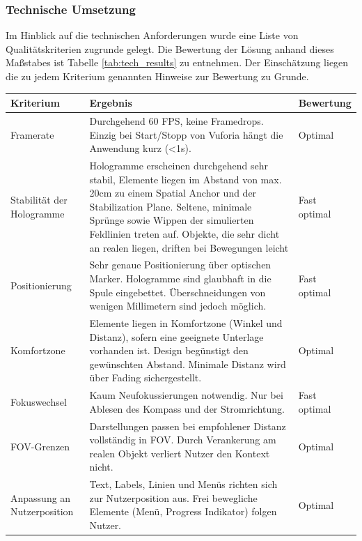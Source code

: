 \subsubsection{Technische Umsetzung}
Im Hinblick auf die technischen Anforderungen wurde eine Liste von Qualitätskriterien zugrunde gelegt. Die Bewertung der Lösung anhand dieses Maßstabes ist Tabelle \ref{tab:tech_results} zu entnehmen. Der Einschätzung liegen die zu jedem Kriterium genannten Hinweise zur Bewertung zu Grunde.
\begin{landscape}
	\bgroup
	\setlength\extrarowheight{-2pt}
	\def\arraystretch{1.8}
	\begin{table}
		\centering
		\begin{tabular}{m{2.3cm}|m{15.5cm}|m{2cm}}
			Kriterium & Ergebnis & Bewertung\\
			\hline
			\hline
			Framerate & Durchgehend 60 FPS, keine Framedrops. Einzig bei Start/Stopp von Vuforia hängt die Anwendung kurz (<1s). & Optimal\\
			\hline
			Stabilität der Hologramme & Hologramme erscheinen durchgehend sehr stabil, Elemente liegen im Abstand von max. 20cm zu einem Spatial Anchor und der Stabilization Plane. Seltene, minimale Sprünge sowie Wippen der simulierten Feldlinien treten auf. Objekte, die sehr dicht an realen liegen, driften bei Bewegungen leicht & Fast optimal\\
			\hline
			Positionierung & Sehr genaue Positionierung über optischen Marker. Hologramme sind glaubhaft in die Spule eingebettet. Überschneidungen von wenigen Millimetern sind jedoch möglich. & Fast optimal\\
			\hline
			Komfortzone & Elemente liegen in Komfortzone (Winkel und Distanz), sofern eine geeignete Unterlage vorhanden ist. Design begünstigt den gewünschten Abstand. Minimale Distanz wird über Fading sichergestellt. & Optimal\\
			\hline
			Fokuswechsel & Kaum Neufokussierungen notwendig. Nur bei Ablesen des Kompass und der Stromrichtung. & Fast optimal\\
			\hline
			FOV-Grenzen & Darstellungen passen bei empfohlener Distanz vollständig in FOV. Durch Verankerung am realen Objekt verliert Nutzer den Kontext nicht. & Optimal\\
			\hline
			Anpassung an Nutzerposition & Text, Labels, Linien und Menüs richten sich zur Nutzerposition aus. Frei bewegliche Elemente (Menü, Progress Indikator) folgen Nutzer. & Optimal\\

\end{tabular}
\end{table}
\end{landscape}

